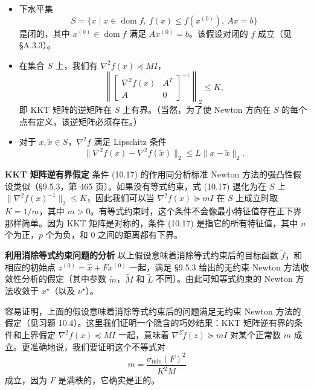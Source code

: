 \documentclass[UTF8,12pt,a4paper,fontset=fandol]{ctexart}
\begin{document}
\begin{itemize}
\item 下水平集
\[
S=\{x\mid x\in\operatorname{dom} f,\ f(x)\leq f(x^{(0)}),\ Ax=b\}
\]
是闭的，其中 $x^{(0)}\in\operatorname{dom} f$ 满足 $Ax^{(0)}=b$。该假设对闭的 $f$ 成立（见 \S A.3.3）。
\item 在集合 $S$ 上，我们有 $\nabla^2 f(x)\preceq MI$，
\begin{equation}
\left\|
\begin{bmatrix}
\nabla^2 f(x) & A^T\\
A & 0
\end{bmatrix}^{-1}
\right\|_2\leq K,
\tag{10.17}
\end{equation}
即 KKT 矩阵的逆矩阵在 $S$ 上有界。（当然，为了使 Newton 方向在 $S$ 的每个点有定义，该逆矩阵必须存在。）
\item 对于 $x,\tilde{x}\in S$，$\nabla^2 f$ 满足 Lipschitz 条件
\[
\|\nabla^2 f(x)-\nabla^2 f(\tilde{x})\|_2\leq L\|x-\tilde{x}\|_2.
\]
\end{itemize}

\noindent\textbf{KKT 矩阵逆有界假定}\quad
条件 (10.17) 的作用同分析标准 Newton 方法的强凸性假设类似（\S9.5.3，第 465 页）。如果没有等式约束，式 (10.17) 退化为在 $S$ 上 $\|\nabla^2 f(x)^{-1}\|_2\leq K$，因此我们可以当 $\nabla^2 f(x)\succeq mI$ 在 $S$ 上成立时取 $K=1/m$，其中 $m>0$。有等式约束时，这个条件不会像最小特征值存在正下界那样简单。因为 KKT 矩阵是对称的，条件 (10.17) 是指它的所有特征值，其中 $n$ 个为正，$p$ 个为负，和 $0$ 之间的距离都有下界。

\noindent\textbf{利用消除等式约束问题的分析}\quad
以上假设意味着消除等式约束后的目标函数 $\tilde{f}$，和相应的初始点 $z^{(0)}=\hat{x}+Fx^{(0)}$ 一起，满足 \S9.5.3 给出的无约束 Newton 方法收敛性分析的假定（其中参数 $\tilde{m}$，$\tilde{M}$ 和 $\tilde{L}$ 不同）。由此可知等式约束的 Newton 方法收敛于 $x^\star$（以及 $\nu^\star$）。

容易证明，上面的假设意味着消除等式约束后的问题满足无约束 Newton 方法的假定（见习题 10.4）。这里我们证明一个隐含的巧妙结果：KKT 矩阵逆有界的条件和上界假定 $\nabla^2 f(x)\preceq MI$ 一起，意味着 $\nabla^2\tilde{f}(z)\succeq mI$ 对某个正常数 $m$ 成立。更准确地说，我们要证明这个不等式对
\begin{equation}
m=\frac{\sigma_{\min}(F)^2}{K^2M}
\tag{10.18}
\end{equation}
成立，因为 $F$ 是满秩的，它确实是正的。
\end{document}
